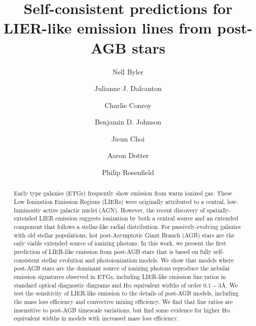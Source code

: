 \documentclass[preprint2]{aastex62}
\newcommand{\ha}{\ensuremath{\mathrm{H\alpha}}\xspace}
\newcommand{\ang}{\ensuremath{\mbox{\AA}}\xspace}
\begin{document}
\title{Self-consistent predictions for LIER-like emission lines from post-AGB stars}
\author[0000-0002-7392-3637]{Nell Byler}

\author[0000-0002-1264-2006]{Julianne J. Dalcanton}
\author[0000-0002-1590-8551]{Charlie Conroy}
\author{Benjamin D. Johnson}
\author{Jieun Choi}
\author{Aaron Dotter}
\author[0000-0001-9306-6049]{Philip Rosenfield}
\begin{abstract}

Early type galaxies (ETGs) frequently show emission from warm ionized gas. These Low Ionization Emission Regions (LIERs) were originally attributed to a central, low-luminosity active galactic nuclei (AGN). However, the recent discovery of spatially-extended LIER emission suggests ionization by both a central source and an extended component that follows a stellar-like radial distribution. For passively-evolving galaxies with old stellar populations, hot post-Asymptotic Giant Branch (AGB) stars are the only viable extended source of ionizing photons. In this work, we present the first prediction of LIER-like emission from post-AGB stars that is based on fully self-consistent stellar evolution and photoionization models. We show that models where post-AGB stars are the dominant source of ionizing photons reproduce the nebular emission signatures observed in ETGs, including LIER-like emission line ratios in standard optical diagnostic diagrams and \ha equivalent widths of order $0.1-3$\ang. We test the sensitivity of LIER-like emission to the details of post-AGB models, including the mass loss efficiency and convective mixing efficiency. We find that line ratios are insensitive to post-AGB timescale variations, but find some evidence for higher \ha equivalent widths in models with increased mass loss efficiency. 

\end{abstract}
\end{document}
